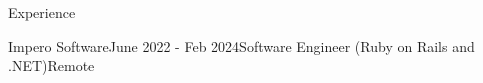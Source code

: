 \documentclass{resume}
\begin{document}
\begin{rSection}{Experience}
\begin{rSubsection}{Impero Software}{June 2022 - Feb 2024}{Software Engineer (Ruby on Rails and .NET)}{Remote}
      
  \end{rSubsection}


  
  \end{rSection}
\end{document}
